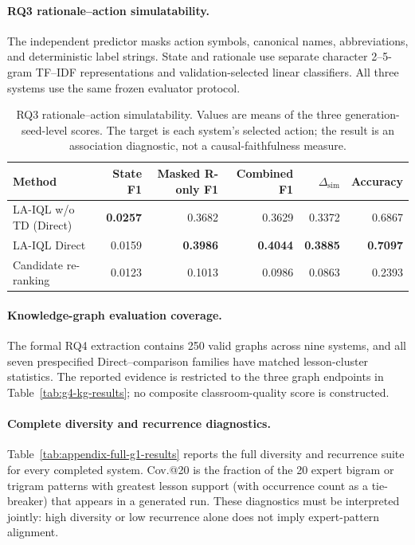 \documentclass[manuscript,review,anonymous]{acmart}
\begin{document}
\paragraph{RQ3 rationale--action simulatability.}
The independent predictor masks action symbols, canonical names,
abbreviations, and deterministic label strings. State and rationale use
separate character 2--5-gram TF--IDF representations and validation-selected
linear classifiers. All three systems use the same frozen evaluator protocol.

\begin{table}[t]
\centering
\small
\setlength{\tabcolsep}{4pt}
\begin{tabular}{lrrrrr}
\toprule
Method & State F1 & Masked R-only F1 & Combined F1 & $\Delta_{\mathrm{sim}}$ & Accuracy \\
\midrule
LA-IQL w/o TD (Direct) & \textbf{0.0257} & 0.3682 & 0.3629 & 0.3372 & 0.6867 \\
LA-IQL Direct & 0.0159 & \textbf{0.3986} & \textbf{0.4044} & \textbf{0.3885} & \textbf{0.7097} \\
Candidate re-ranking & 0.0123 & 0.1013 & 0.0986 & 0.0863 & 0.2393 \\
\bottomrule
\end{tabular}
\caption{RQ3 rationale--action simulatability. Values are means of the three
generation-seed-level scores. The target is each system's selected action; the result is
an association diagnostic, not a causal-faithfulness measure.}
\label{tab:appendix-g3-results}
\end{table}

\paragraph{Knowledge-graph evaluation coverage.}
The formal RQ4 extraction contains 250 valid graphs across nine systems, and
all seven prespecified Direct--comparison families have matched lesson-cluster
statistics. The reported evidence is restricted to the three graph endpoints
in Table~\ref{tab:g4-kg-results}; no composite classroom-quality score is
constructed.

\paragraph{Complete diversity and recurrence diagnostics.}
Table~\ref{tab:appendix-full-g1-results} reports the full diversity and recurrence suite for every
completed system. Cov.@20 is the fraction of the 20 expert bigram or trigram
patterns with greatest lesson support (with occurrence count as a tie-breaker)
that appears in a generated run. These diagnostics must be interpreted jointly:
high diversity or low recurrence alone does not imply expert-pattern alignment.
\end{document}
